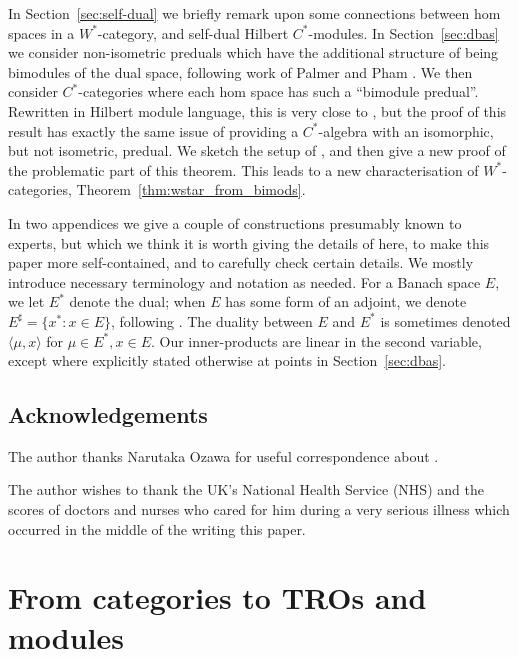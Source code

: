 \documentclass[a4paper,11pt]{article}
\theoremstyle{plain}
\theoremstyle{remark}
\newcommand{\ip}[2]{{\langle {#1} , {#2} \rangle}}
\begin{document}
In Section~\ref{sec:self-dual} we briefly remark upon some connections between hom spaces in a $W^*$-category, and self-dual Hilbert $C^*$-modules.  In Section~\ref{sec:dbas} we consider non-isometric preduals which have the additional structure of being bimodules of the dual space, following work of Palmer \cite{palmer_arens_mult_Wstar} and Pham \cite{pham_vn_algs}.
We then consider $C^*$-categories where each hom space has such a ``bimodule predual''.  Rewritten in Hilbert module language, this is very close to \cite[Theorem~2.6]{Schweizer_HilbModsPredual}, but the proof of this result has exactly the same issue of providing a $C^*$-algebra with an isomorphic, but not isometric, predual.  We sketch the setup of \cite{Schweizer_HilbModsPredual}, and then give a new proof of the problematic part of this theorem.  This leads to a new characterisation of $W^*$-categories, Theorem~\ref{thm:wstar_from_bimods}.

In two appendices we give a couple of constructions presumably known to experts, but which we think it is worth giving the details of here, to make this paper more self-contained, and to carefully check certain details.  We mostly introduce necessary terminology and notation as needed.  For a Banach space $E$, we let $E^*$ denote the dual; when $E$ has some form of an adjoint, we denote $E^\sharp = \{ x^* : x\in E \}$, following \cite{EOR_InjectivityNuclearityOS}.  The duality between $E$ and $E^*$ is sometimes denoted $\ip{\mu}{x}$ for $\mu\in E^*, x\in E$.  Our inner-products are linear in the second variable, except where explicitly stated otherwise at points in Section~\ref{sec:dbas}.




\subsection{Acknowledgements}

The author thanks Narutaka Ozawa for useful correspondence about \cite{EOR_InjectivityNuclearityOS}.

The author wishes to thank the UK's National Health Service (NHS) and the scores of doctors and nurses who cared for him during a very serious illness which occurred in the middle of the writing this paper.


\section{From categories to TROs and modules}\label{sec:cats_to_TROs}
\end{document}
